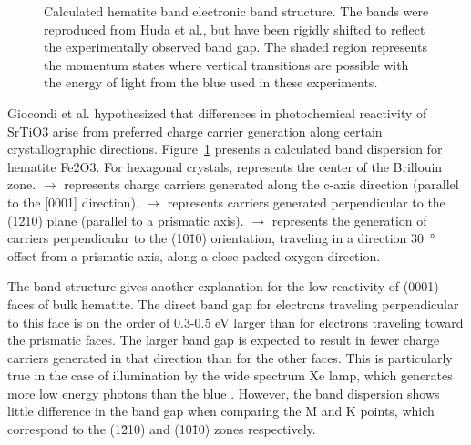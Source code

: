 \documentclass[12pt,%
              twoside,
               letterpaper]{uiothesis}
\begin{document}
\begin{figure}
    \begin{center}
    \caption[Calculated hematite band electronic band structure]{%
        Calculated hematite band electronic band structure. The bands were reproduced from
        Huda et al.,\cite{Huda:2010kx} but have been rigidly shifted to reflect the experimentally
        observed band gap. The shaded region represents the momentum states where vertical
        transitions are possible with the energy of light from the blue  used in these
        experiments.}
    \label{fig:fe2o3dispersion}
    \end{center}
\end{figure}
Giocondi et al.\cite{Giocondi:2007fa} hypothesized that differences in photochemical
reactivity of SrTiO3 arise from preferred charge carrier generation along certain
crystallographic directions. Figure~\ref{fig:fe2o3dispersion} presents a calculated band
dispersion for hematite Fe2O3. For hexagonal crystals, {\textGamma} represents the
center of the Brillouin zone. \textGamma$\rightarrow${\textAlpha} represents charge
carriers generated along the c-axis direction (parallel to the [0001] direction).
\textGamma$\rightarrow${\textMu} represents carriers generated perpendicular to the
(1\={2}10) plane (parallel to a prismatic axis). \textGamma$\rightarrow${\textKappa}
represents the generation of carriers perpendicular to the (10\={1}0) orientation,
traveling in a direction \SI{30}{\degree} offset from a prismatic axis, along a close
packed oxygen direction.

The band structure gives another explanation for the low reactivity of (0001) faces of
bulk hematite. The direct band gap for electrons traveling perpendicular to this face is
on the order of 0.3-0.5 \si{\electronvolt} larger than for electrons traveling toward the
prismatic faces. The larger band gap is expected to result in fewer charge carriers
generated in that direction than for the other faces. This is particularly true in the
case of illumination by the wide spectrum Xe lamp, which generates more low energy photons
than the blue . However, the band dispersion shows little difference in the band
gap when comparing the M and K points, which correspond to the (1\={2}10) and (10\={1}0)
zones respectively.
\end{document}
